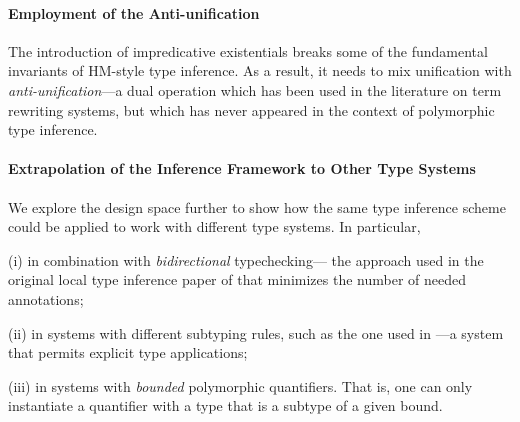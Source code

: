 \paragraph{Employment of the Anti-unification}
    The introduction of impredicative existentials breaks some of the
    fundamental invariants of HM-style type inference. As a result, it needs to
    mix unification with \emph{anti-unification}---a dual operation which has
    been used in the literature on term rewriting systems, but which has never
    appeared in the context of polymorphic type inference.

\paragraph{Extrapolation of the Inference Framework to Other Type Systems}
    We explore the design space further to show how the
    same type inference scheme could be applied to
    work with different type systems. In particular,
    \begin{enumerate*}
      \item[(i)] in combination with \emph{bidirectional} typechecking---
        the approach used in the original local type inference paper of \citet{pierce2000:local}
        that minimizes the number of needed annotations;
      \item[(ii)] in systems with different subtyping rules, such as  
        the one used in \citet{zhao22:elementary}---a system that
        permits explicit type applications;
      \item[(iii)] in systems with \emph{bounded} polymorphic quantifiers.
        That is, one can only instantiate a quantifier with a 
        type that is a subtype of a given bound.
    \end{enumerate*}
